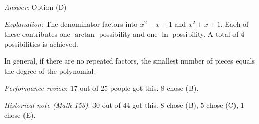 \documentclass[10pt]{amsart}
\begin{document}
\begin{enumerate}
  {\em Answer}: Option (D)

  {\em Explanation}: The denominator factors into $x^2 - x + 1$ and
  $x^2 + x + 1$. Each of these contributes one $\arctan$ possibility
  and one $\ln$ possibility. A total of $4$ possibilities is achieved.

  In general, if there are no repeated factors, the smallest number of
  pieces equals the degree of the polynomial.

  {\em Performance review}: $17$ out of $25$ people got this. $8$
  chose (B).

  {\em Historical note (Math 153)}: $30$ out of $44$ got this. $8$ chose (B),
  $5$ chose (C), $1$ chose (E).

\end{enumerate}
\end{document}
